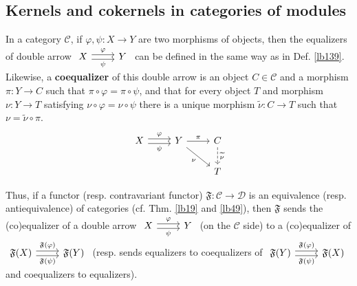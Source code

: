 \documentclass[12pt,b5paper,notitlepage]{report}
\theoremstyle{definition}
\theoremstyle{plain}
\newcommand{\fk}{\mathfrak}
\newcommand{\mc}{\mathcal}
\newcommand{\wtd}{\widetilde}
\numberwithin{equation}{section}
\begin{document}
\begin{subappendices}
\section{Kernels and cokernels in categories of modules}

In a category $\mc C$, if $\varphi,\psi:X\rightarrow Y$ are two morphisms of objects, then the equalizers of double arrow
$\begin{tikzcd}
X \arrow[r,shift left, "\varphi"] \arrow[r,shift right,"\psi"'] & Y
\end{tikzcd}$
can be defined in the same way as in Def. \ref{lb139}. Likewise, a \textbf{coequalizer}  of this double arrow is an object $C\in\mc C$ and a morphism $\pi:Y\rightarrow C$ such that $\pi\circ\varphi=\pi\circ\psi$, and that for every object $T$ and morphism $\nu:Y\rightarrow T$ satisfying $\nu\circ\varphi=\nu\circ\psi$ there is a unique morphism $\wtd\nu:C\rightarrow T$ such that $\nu=\wtd\nu\circ\pi$.
\begin{equation}
\begin{tikzcd}
X \arrow[r, "\varphi", shift left] \arrow[r, "\psi"', shift right] & Y \arrow[r, "\pi"] \arrow[rd, "\nu"'] & C \arrow[d, "\wtd\nu", dashed] \\
                                                                   &                                       & T                             
\end{tikzcd}
\end{equation}


Thus, if a functor (resp. contravariant functor) $\fk F:\mc C\rightarrow\mc D$ is an equivalence (resp. antiequivalence) of categories (cf. Thm. \ref{lb19} and \ref{lb49}), then $\fk F$ sends the (co)equalizer of a double arrow $\begin{tikzcd}
X \arrow[r,shift left, "\varphi"] \arrow[r,shift right,"\psi"'] & Y
\end{tikzcd}$
(on the $\mc C$ side) to a (co)equalizer of 
$\begin{tikzcd}
\fk F(X) \arrow[r,shift left, "\fk F(\varphi)"] \arrow[r,shift right,"\fk F(\psi)"'] & \fk F(Y)
\end{tikzcd}$
(resp. sends equalizers to coequalizers of $\begin{tikzcd}
\fk F(Y) \arrow[r,shift left, "\fk F(\varphi)"] \arrow[r,shift right,"\fk F(\psi)"'] & \fk F(X)
\end{tikzcd}$ and coequalizers to equalizers).



\end{subappendices}
\end{document}
